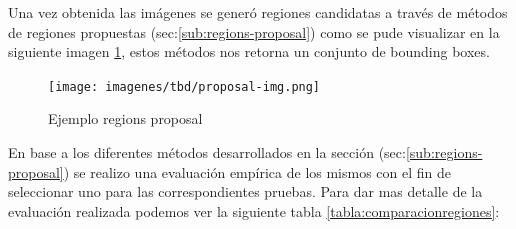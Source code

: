 
Una vez obtenida las imágenes se generó regiones candidatas a través de métodos de regiones propuestas (sec:\ref{sub:regions-proposal}) como se pude visualizar en la siguiente imagen \ref{Fig:rp-ejemplo}, estos métodos nos retorna  un conjunto de bounding boxes.

\begin{figure}[H] \centering
  \texttt{[image: imagenes/tbd/proposal-img.png]}
  \caption{Ejemplo regions proposal}\label{Fig:rp-ejemplo}
\end{figure}

En base a los diferentes métodos desarrollados en la sección (sec:\ref{sub:regions-proposal}) se realizo una evaluación empírica de los mismos con el fin de seleccionar uno para las correspondientes pruebas. Para dar mas detalle de la evaluación realizada podemos ver la siguiente tabla \ref{tabla:comparacionregiones}:

